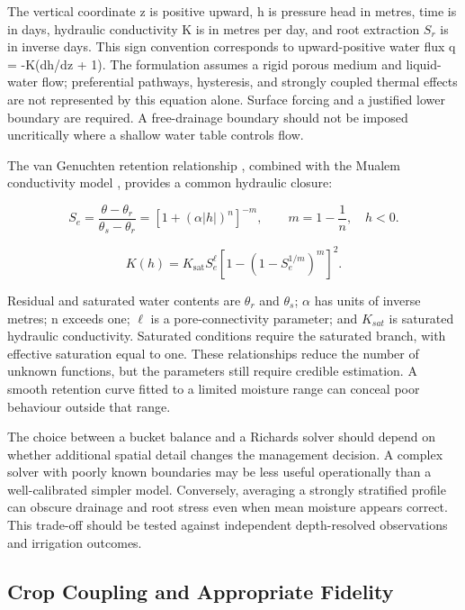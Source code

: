 \documentclass[11pt,a4paper]{article}
\begin{document}
The vertical coordinate z is positive upward, h is pressure head in metres, time is in days, hydraulic conductivity K is in metres per day, and root extraction $S_{r}$ is in inverse days. This sign convention corresponds to upward-positive water flux q = -K(dh/dz + 1). The formulation assumes a rigid porous medium and liquid-water flow; preferential pathways, hysteresis, and strongly coupled thermal effects are not represented by this equation alone. Surface forcing and a justified lower boundary are required. A free-drainage boundary should not be imposed uncritically where a shallow water table controls flow.

The van Genuchten retention relationship \cite{R08}, combined with the Mualem conductivity model \cite{R09}, provides a common hydraulic closure:

\begin{equation}
S_e=\frac{\theta-\theta_r}{\theta_s-\theta_r}=\left[1+(\alpha|h|)^n\right]^{-m},\qquad m=1-\frac{1}{n},\quad h<0.
\label{eq:5}
\end{equation}

\begin{equation}
K(h)=K_{\mathrm{sat}}S_e^{\ell}\left[1-\left(1-S_e^{1/m}\right)^m\right]^2.
\label{eq:6}
\end{equation}

Residual and saturated water contents are $\theta_{r}$ and $\theta_{s}$; $\alpha$ has units of inverse metres; n exceeds one; $\ell$ is a pore-connectivity parameter; and $K_{sat}$ is saturated hydraulic conductivity. Saturated conditions require the saturated branch, with effective saturation equal to one. These relationships reduce the number of unknown functions, but the parameters still require credible estimation. A smooth retention curve fitted to a limited moisture range can conceal poor behaviour outside that range.

The choice between a bucket balance and a Richards solver should depend on whether additional spatial detail changes the management decision. A complex solver with poorly known boundaries may be less useful operationally than a well-calibrated simpler model. Conversely, averaging a strongly stratified profile can obscure drainage and root stress even when mean moisture appears correct. This trade-off should be tested against independent depth-resolved observations and irrigation outcomes.

\subsection{Crop Coupling and Appropriate Fidelity}
\end{document}
